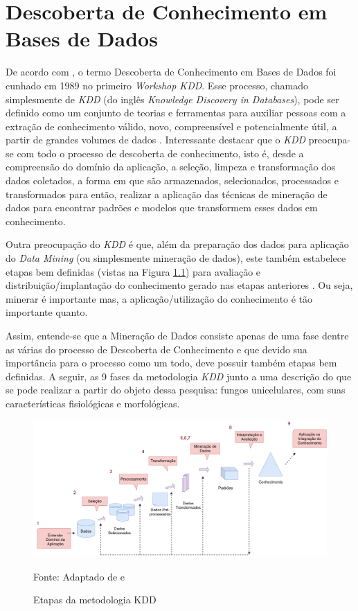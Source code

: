\documentclass[tcc2]{classe_uftex/uftex}
\begin{document}
\chapter{Descoberta de Conhecimento em Bases de Dados}
\label{cap:kdd}
De acordo com , o termo Descoberta de Conhecimento em Bases de Dados foi cunhado em 1989 no primeiro \emph{Workshop KDD}. Esse processo, chamado simplesmente de \emph{KDD} (do inglês \emph{Knowledge Discovery in Databases}), pode ser definido como um conjunto de teorias e ferramentas para auxiliar pessoas com a extração de conhecimento válido, novo, compreensível e potencialmente útil, a partir de grandes volumes de dados \cite{1996:Fayyad}. Interessante destacar que o \emph{KDD} preocupa-se com todo o processo de descoberta de conhecimento, isto é, desde a compreensão do domínio da aplicação, a seleção, limpeza e transformação dos dados coletados, a forma em que são armazenados, selecionados, processados e transformados para então, realizar a aplicação das técnicas de mineração de dados para encontrar padrões e modelos que transformem esses dados em conhecimento. 

Outra preocupação do \emph{KDD} é que, além da preparação dos dados para aplicação do \emph{Data Mining} (ou simplesmente mineração de dados), este também estabelece  etapas bem definidas (vistas na Figura \ref{fig:fig001}) para avaliação e distribuição/implantação do conhecimento gerado nas etapas anteriores \cite{2009:Camilo}. Ou seja, minerar é importante mas, a aplicação/utilização do conhecimento é tão importante quanto.

Assim, entende-se que a Mineração de Dados consiste apenas de uma fase dentre as várias do processo de Descoberta de Conhecimento e que devido sua importância para o processo como um todo, deve possuir também etapas bem definidas. A seguir, as 9 fases da metodologia \emph{KDD} junto a uma descrição do que se pode realizar a partir do objeto dessa pesquisa: fungos unicelulares, com suas características fisiológicas e morfológicas.

    \begin{figure}[ht]
    \centering
      \includegraphics[scale=0.3]{TCC_Johnny/img/kdd_n.png}
      \caption{Etapas da metodologia KDD}
      \raggedright \scriptsize \centering Fonte: Adaptado de  e 
      \label{fig:fig001}
    \end{figure}
\end{document}
